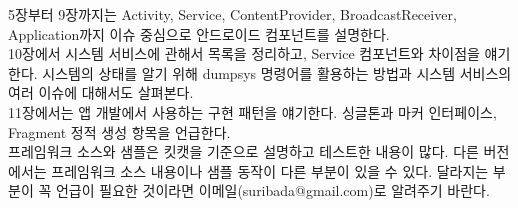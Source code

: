 \documentclass[a4paper,hidelinks,10pt,openany]{book} %
\begin{document}
5장부터 9장까지는 Activity, Service, ContentProvider, BroadcastReceiver, Application까지 이슈 중심으로 안드로이드 컴포넌트를 설명한다.\\

10장에서 시스템 서비스에 관해서 목록을 정리하고, Service 컴포넌트와 차이점을 얘기한다. 시스템의 상태를 알기 위해 dumpsys 명령어를 활용하는 방법과 시스템 서비스의 여러 이슈에 대해서도 살펴본다.\\

11장에서는 앱 개발에서 사용하는 구현 패턴을 얘기한다. 싱글톤과 마커 인터페이스, Fragment 정적 생성 항목을 언급한다.\\

프레임워크 소스와 샘플은 킷캣을 기준으로 설명하고 테스트한 내용이 많다. 다른 버전에서는 프레임워크 소스 내용이나 샘플 동작이 다른 부분이 있을 수 있다. 달라지는 부분이 꼭 언급이 필요한 것이라면 이메일(suribada@gmail.com)로 알려주기 바란다.









%









\ 
%

%
%




\end{document}

